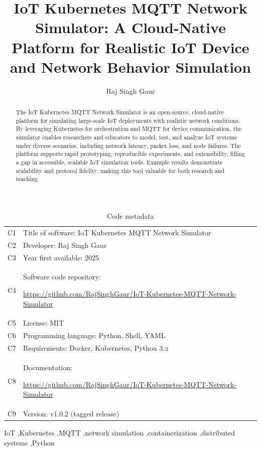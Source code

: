 \documentclass[review]{elsarticle}
\begin{document}
\begin{table}[!h]
\scriptsize
\setlength{\tabcolsep}{2pt}
\begin{tabular}{|p{2.5cm}|p{10cm}|}
\hline
C1 & Title of software: IoT Kubernetes MQTT Network Simulator \\
C2 & Developer: Raj Singh Gaur \\
C3 & Year first available: 2025 \\
C4 & Software code repository: {\raggedright\url{https://github.com/RajSinghGaur/IoT-Kubernetes-MQTT-Network-Simulator}\par} \\
C5 & License: MIT \\
C6 & Programming language: Python, Shell, YAML \\
C7 & Requirements: Docker, Kubernetes, Python 3.x \\
C8 & Documentation: {\raggedright\url{https://github.com/RajSinghGaur/IoT-Kubernetes-MQTT-Network-Simulator}\par} \\
C9 & Version: v1.0.2 (tagged release) \\
\hline
\end{tabular}
\caption{Code metadata}
\end{table}

\title{IoT Kubernetes MQTT Network Simulator: A Cloud-Native Platform for Realistic IoT Device and Network Behavior Simulation}

\author{Raj Singh Gaur}
\address{Independent Researcher}

\begin{abstract}
The IoT Kubernetes MQTT Network Simulator is an open-source, cloud-native platform for simulating large-scale IoT deployments with realistic network conditions. By leveraging Kubernetes for orchestration and MQTT for device communication, the simulator enables researchers and educators to model, test, and analyze IoT systems under diverse scenarios, including network latency, packet loss, and node failures. The platform supports rapid prototyping, reproducible experiments, and extensibility, filling a gap in accessible, scalable IoT simulation tools. Example results demonstrate scalability and protocol fidelity, making this tool valuable for both research and teaching.
\end{abstract}

\begin{keyword}
IoT \sep Kubernetes \sep MQTT \sep network simulation \sep containerization \sep distributed systems \sep Python
\end{keyword}
\end{document}
